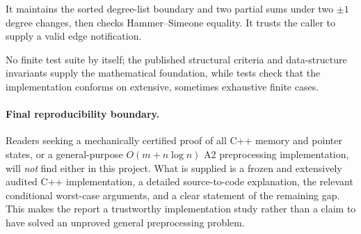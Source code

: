 \begin{description}[leftmargin=*,style=nextline]
\item[Why can split recognition be constant time?] It maintains the sorted degree-list boundary and two partial sums under two \(\pm1\) degree changes, then checks Hammer--Simeone equality.  It trusts the caller to supply a valid edge notification.
\item[What proves the tested code is universally correct?] No finite test suite by itself; the published structural criteria and data-structure invariants supply the mathematical foundation, while tests check that the implementation conforms on extensive, sometimes exhaustive finite cases.
\end{description}

\paragraph{Final reproducibility boundary.} Readers seeking a mechanically certified proof of all C++ memory and pointer states, or a general-purpose \(O(m+n\log n)\) A2 preprocessing implementation, will \emph{not} find either in this project.  What is supplied is a frozen and extensively audited C++ implementation, a detailed source-to-code explanation, the relevant conditional worst-case arguments, and a clear statement of the remaining gap.  This makes the report a trustworthy implementation study rather than a claim to have solved an unproved general preprocessing problem.